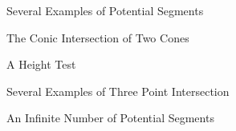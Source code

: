 
\newpage


\begin{figure}
\vspace{3cm}
\caption{Several Examples of Potential Segments}
\label{fig:potential-seg}
\end{figure}

\begin{figure}
\vspace{3cm}
\caption{The Conic Intersection of Two Cones}
\label{fig:cone-cone-example}
\end{figure}

\begin{figure}
\vspace{6cm}
\caption{A Height Test}
\label{fig:height-test}
\end{figure}



\begin{figure}
\vspace{4cm}
\caption{Several Examples of Three Point Intersection}
\label{fig:three-point}
\end{figure}



\begin{figure}
\vspace{4cm}
\caption{An Infinite Number of Potential Segments}
\label{fig:infinite}
\end{figure}

